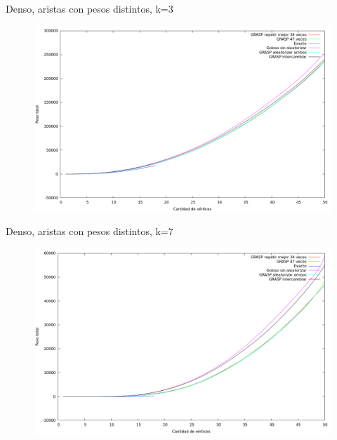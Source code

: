 \vspace*{0.5cm}

Denso, aristas con pesos distintos, k=3
\vspace*{0.5cm}

\begin{figure}[h]
  \begin{center}
    \includegraphics[scale=0.35]{imagenes/ej6-denso-pesos-distintos-k3-peso.png}
  \end{center}
\end{figure}

\vspace*{0.5cm}

Denso, aristas con pesos distintos, k=7
\vspace*{0.5cm}

\begin{figure}[h]
  \begin{center}
    \includegraphics[scale=0.35]{imagenes/ej6-denso-pesos-distintos-k7-peso.png}
  \end{center}
\end{figure}

